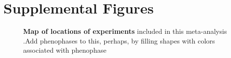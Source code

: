 \documentclass{article}
\begin{document}
\section*{Supplemental Figures}

% 

% 
 \begin{figure}[h]
\centering
  \noindent{}
 \caption{\textbf{Map of locations of experiments} included in this meta-analysis .Add phenophases to this, perhaps, by filling shapes with colors associated with phenophase} 
 \label{fig:map}
 \end{figure}
\end{document}
